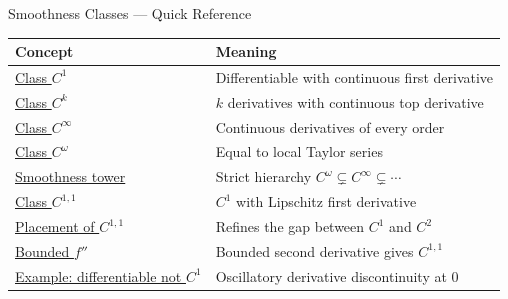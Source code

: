 \begin{toolkitbox}{Smoothness Classes --- Quick Reference}
\small
\begin{tabular}{l l}
\toprule
\textbf{Concept} & \textbf{Meaning} \\
\midrule
\hyperref[def:class-c1]{Class \(C^1\)} & Differentiable with continuous first derivative \\
\hyperref[def:class-ck]{Class \(C^k\)} & \(k\) derivatives with continuous top derivative \\
\hyperref[def:class-cinfty]{Class \(C^\infty\)} & Continuous derivatives of every order \\
\hyperref[def:class-comega]{Class \(C^\omega\)} & Equal to local Taylor series \\
\hyperref[thm:smoothness-tower]{Smoothness tower} & Strict hierarchy \(C^\omega\subsetneq C^\infty\subsetneq\cdots\) \\
\hyperref[def:class-c11]{Class \(C^{1,1}\)} & \(C^1\) with Lipschitz first derivative \\
\hyperref[thm:c11-placement]{Placement of \(C^{1,1}\)} & Refines the gap between \(C^1\) and \(C^2\) \\
\hyperref[cor:bounded-second-derivative-implies-c11]{Bounded \(f''\)} & Bounded second derivative gives \(C^{1,1}\) \\
\hyperref[ex:x2sin]{Example: differentiable not \(C^1\)} & Oscillatory derivative discontinuity at \(0\) \\
\bottomrule
\end{tabular}
\end{toolkitbox}


